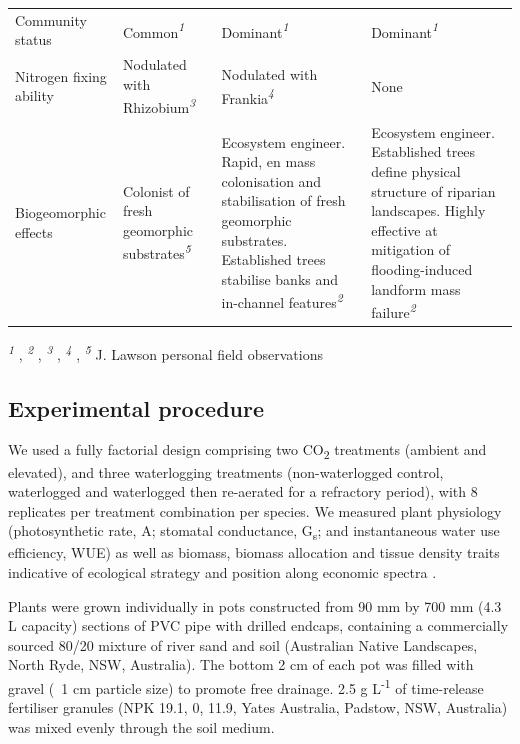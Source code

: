 \documentclass[12pt,a4paper]{memoir}
\begin{document}
\begin{threeparttable}[h!]
\begin{tabularx}{\textwidth}{XXXX}
Community status & Common\textit{\textsuperscript{1}} & Dominant\textit{\textsuperscript{1}} & Dominant\textit{\textsuperscript{1}} \\
Nitrogen fixing ability & Nodulated with Rhizobium\textit{\textsuperscript{3}} & Nodulated with Frankia\textit{\textsuperscript{4}} & None \\
Biogeomorphic effects & Colonist of fresh geomorphic substrates\textit{\textsuperscript{5}} & Ecosystem engineer. Rapid, en mass colonisation and stabilisation of fresh geomorphic substrates. Established trees stabilise banks and in-channel features\textit{\textsuperscript{2}} & Ecosystem engineer. Established trees define physical structure of riparian landscapes. Highly effective at mitigation of flooding-induced landform mass failure\textit{\textsuperscript{2}} \\ \hline
\end{tabularx}
  \begin{tablenotes}
    \item \textit{\textsuperscript{1}} \cite{plantnet}, \textit{\textsuperscript{2}} \cite{Hubble2010}, \textit{\textsuperscript{3}} \cite{roughley1987acacias}, \textit{\textsuperscript{4}} \cite{Dawson1989}, \textit{\textsuperscript{5}} J. Lawson personal field observations
  \end{tablenotes}
\end{threeparttable}

\clearpage

\subsection*{Experimental procedure}
We used a fully factorial design comprising two CO\textsubscript{2} treatments (ambient and elevated), and three waterlogging treatments (non-waterlogged control, waterlogged and waterlogged then re-aerated for a refractory period), with 8 replicates per treatment combination per species. We measured plant physiology (photosynthetic rate, A; stomatal conductance, G\textsubscript{s}; and instantaneous water use efficiency, WUE) as well as biomass, biomass allocation and tissue density traits indicative of ecological strategy and position along economic spectra \citep{Reich2014}.

Plants were grown individually in pots constructed from 90 mm by 700 mm (4.3 L capacity) sections of PVC pipe with drilled endcaps, containing a commercially sourced 80/20 mixture of river sand and soil (Australian Native Landscapes, North Ryde, NSW, Australia). The bottom 2 cm of each pot was filled with gravel (~1 cm particle size) to promote free drainage. 2.5 g L\textsuperscript{-1} of time-release fertiliser granules (NPK 19.1, 0, 11.9, Yates Australia, Padstow, NSW, Australia) was mixed evenly through the soil medium.
\end{document}
